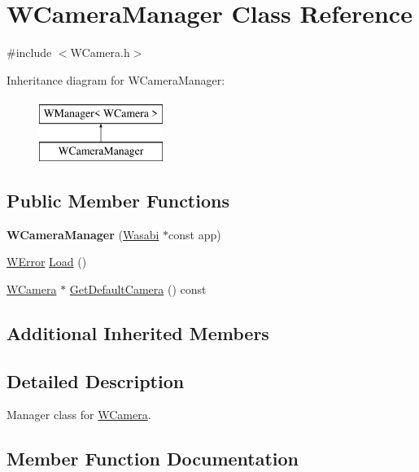 \hypertarget{class_w_camera_manager}{}\section{W\+Camera\+Manager Class Reference}
\label{class_w_camera_manager}


{\ttfamily \#include $<$W\+Camera.\+h$>$}

Inheritance diagram for W\+Camera\+Manager\+:\begin{figure}[H]
\begin{center}
\leavevmode
\includegraphics[height=2.000000cm]{class_w_camera_manager}
\end{center}
\end{figure}
\subsection*{Public Member Functions}
\begin{DoxyCompactItemize}
\item 
{\bfseries W\+Camera\+Manager} (\hyperlink{class_wasabi}{Wasabi} $\ast$const app)\hypertarget{class_w_camera_manager_aee9651ebfbf1e66456b10b191cc1dbf5}{}\label{class_w_camera_manager_aee9651ebfbf1e66456b10b191cc1dbf5}

\item 
\hyperlink{class_w_error}{W\+Error} \hyperlink{class_w_camera_manager_a40f417e67c5d51ba5a5a00ce284f63c2}{Load} ()
\item 
\hyperlink{class_w_camera}{W\+Camera} $\ast$ \hyperlink{class_w_camera_manager_a4b691395b3febca183af76eafc88808b}{Get\+Default\+Camera} () const 
\end{DoxyCompactItemize}
\subsection*{Additional Inherited Members}


\subsection{Detailed Description}
Manager class for \hyperlink{class_w_camera}{W\+Camera}. 

\subsection{Member Function Documentation}
